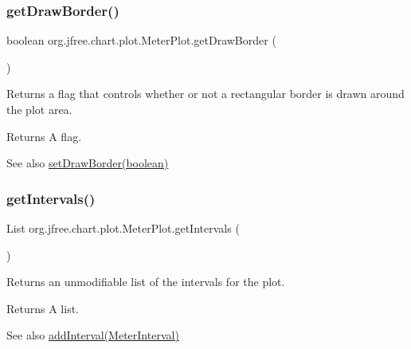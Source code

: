 \subsubsection{\texorpdfstring{get\+Draw\+Border()}{getDrawBorder()}}
{\footnotesize\ttfamily boolean org.\+jfree.\+chart.\+plot.\+Meter\+Plot.\+get\+Draw\+Border (\begin{DoxyParamCaption}{ }\end{DoxyParamCaption})}

Returns a flag that controls whether or not a rectangular border is drawn around the plot area.

\begin{DoxyReturn}{Returns}
A flag.
\end{DoxyReturn}
\begin{DoxySeeAlso}{See also}
\mbox{\hyperlink{classorg_1_1jfree_1_1chart_1_1plot_1_1_meter_plot_a4926421a84350958e8e7cf40f25f2e4a}{set\+Draw\+Border(boolean)}} 
\end{DoxySeeAlso}
\mbox{\label{classorg_1_1jfree_1_1chart_1_1plot_1_1_meter_plot_a1b0919aaa6783b57c61ab7c8868b87d9}} 
\subsubsection{\texorpdfstring{get\+Intervals()}{getIntervals()}}
{\footnotesize\ttfamily List org.\+jfree.\+chart.\+plot.\+Meter\+Plot.\+get\+Intervals (\begin{DoxyParamCaption}{ }\end{DoxyParamCaption})}

Returns an unmodifiable list of the intervals for the plot.

\begin{DoxyReturn}{Returns}
A list.
\end{DoxyReturn}
\begin{DoxySeeAlso}{See also}
\mbox{\hyperlink{classorg_1_1jfree_1_1chart_1_1plot_1_1_meter_plot_ab60286f0f485696e89b642d0bcad3c83}{add\+Interval(\+Meter\+Interval)}} 
\end{DoxySeeAlso}
\mbox{\label{classorg_1_1jfree_1_1chart_1_1plot_1_1_meter_plot_a45430436abd34bc809b0a96d01f1e213}} 
